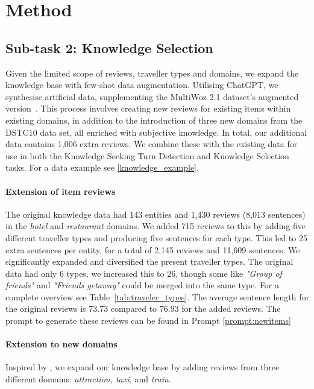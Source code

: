 \documentclass[11pt]{article}
\begin{document}
\section{Method}
\subsection{Sub-task 2: Knowledge Selection}
Given the limited scope of reviews, traveller types and domains, we expand the knowledge base with few-shot data augmentation. Utilising ChatGPT, we synthesise artificial data, supplementing the MultiWoz 2.1 dataset's augmented version~\cite{eric-etal-2020-multiwoz}. This process involves creating new reviews for existing items within existing domains, in addition to the introduction of three new domains from the DSTC10 data set, all enriched with subjective knowledge.  In total, our additional data contains 1,006 extra reviews. We combine these with the existing data for use in both the Knowledge Seeking Turn Detection and Knowledge Selection tasks. For a data example see \ref{knowledge_example}.

\paragraph{Extension of item reviews}
The original knowledge data had 143 entities and 1,430 reviews (8,013 sentences) in the \textit{hotel} and \textit{restaurant} domains. We added 715 reviews %
to this by adding five different traveller types and producing five sentences for each type. This led to 25 extra sentences per entity,  for a total of 2,145 reviews and 11,609 sentences. We significantly expanded and diversified the present traveller types. The original data had only 6 types, we increased this to 26, though some like \textit{"Group of friends"} and \textit{"Friends getaway"} could be merged into the same type. For a complete overview see Table~\ref{tab:traveler_types}. The average sentence length for the original reviews is 73.73 compared to 76.93 for the added reviews. The prompt to generate these reviews can be found in Prompt \ref{prompt:newitems}

\paragraph{Extension to new domains}
Inspired by \citet{thulkeDSTC2021}, we expand our knowledge base by adding reviews from three different domains: \textit{attraction, taxi,} and \textit{train}.
\end{document}
